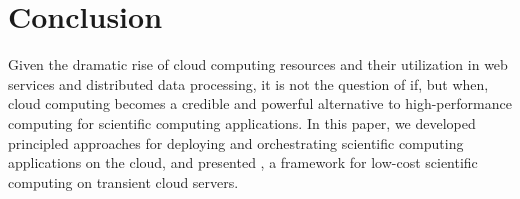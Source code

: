 
\section{Conclusion}
\label{sec:conclusion}
Given the dramatic rise of cloud computing resources and their utilization in web services and distributed data processing, it is not the question of if, but when, cloud computing becomes a credible and powerful alternative to high-performance computing for scientific computing applications.
In this paper, we developed principled approaches for deploying and orchestrating scientific computing applications on the cloud, and presented \sysname, a framework for low-cost scientific computing on  transient cloud servers. 


